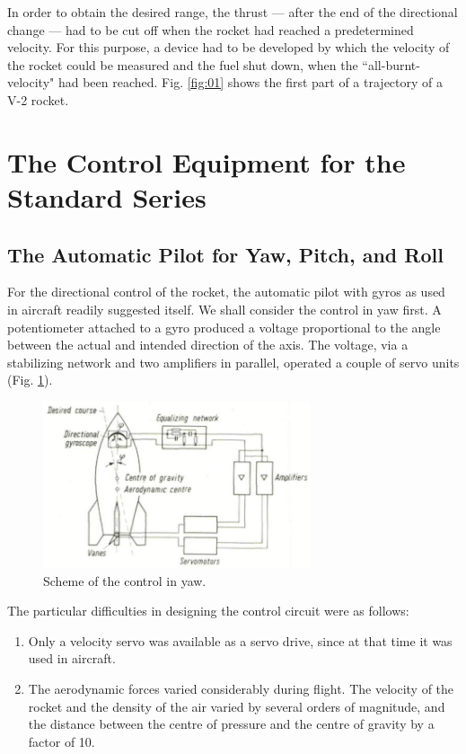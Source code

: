 \documentclass[12pt, a4paper]{article}
\begin{document}
In order to obtain the desired range, the thrust — after the end of the directional change — had to be cut off when the rocket had reached a predetermined velocity. For this purpose, a device had to be developed by which the velocity of the rocket could be measured and the fuel shut down, when the ``all-burnt-velocity" had been reached. Fig. \ref{fig:01} shows the first part of a trajectory of a V-2 rocket.

\section{The Control Equipment for the Standard Series}

\subsection{The Automatic Pilot for Yaw, Pitch, and Roll}

For the directional control of the rocket, the automatic pilot with gyros as used in aircraft readily suggested itself. We shall consider the control in yaw first. A potentiometer attached to a gyro produced a voltage proportional to the angle between the actual and intended direction of the axis. The voltage, via a stabilizing network and two amplifiers in parallel, operated a couple of servo units (Fig. \ref{fig:02}).

\begin{figure}[ht]
  \centering
  \includegraphics[width=0.7\textwidth]{figs/ctrl-02.png}
  \caption{Scheme of the control in yaw.}
  \label{fig:02}
\end{figure}

The particular difficulties in designing the control circuit were as follows:

\begin{enumerate}
  \item Only a velocity servo was available as a servo drive, since at that time it was used in aircraft.
  \item The aerodynamic forces varied considerably during flight. The velocity of the rocket and the density of the air varied by several orders of magnitude, and the distance between the centre of pressure and the centre of gravity by a factor of 10.
\end{enumerate}
\end{document}
